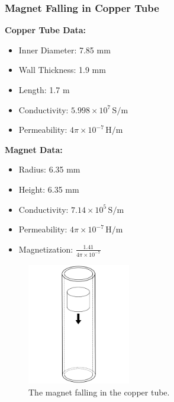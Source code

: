 \documentclass[notheorems,serif]{beamer}
\begin{document}
\begin{CJK}{UTF8}{gkai}
\begin{frame}
    \frametitle{Magnet Falling in Copper Tube}
\begin{minipage}[b]{0.6\linewidth}
\textbf{Copper Tube Data:}
\begin{itemize}
    \item Inner Diameter: 7.85 mm
    \item Wall Thickness: 1.9 mm
    \item Length: 1.7 m
    \item Conductivity: \( 5.998 \times 10^7 \, \text{S/m} \)
    \item Permeability: \( 4\pi \times 10^{-7} \, \text{H/m} \)
\end{itemize}

\textbf{Magnet Data:}
\begin{itemize}
    \item Radius: 6.35 mm
    \item Height: 6.35 mm
    \item Conductivity: \( 7.14 \times 10^5 \, \text{S/m} \)
    \item Permeability: \( 4\pi \times 10^{-7} \, \text{H/m} \)
    \item Magnetization: \( \frac{1.41}{4\pi \times 10^{-7}} \)
\end{itemize}
\vspace{10pt}
\end{minipage}
\hfill
\begin{minipage}[b]{0.38\linewidth}
    \centering
    \begin{figure}[htpb]
        \centering
        \includegraphics[width=0.4\textwidth]{../figures/movingmaxwell/magnet_falling.pdf}
        \caption{The magnet falling in the copper tube.}
    \end{figure}
\end{minipage}


\end{frame}
\end{CJK}
\end{document}
